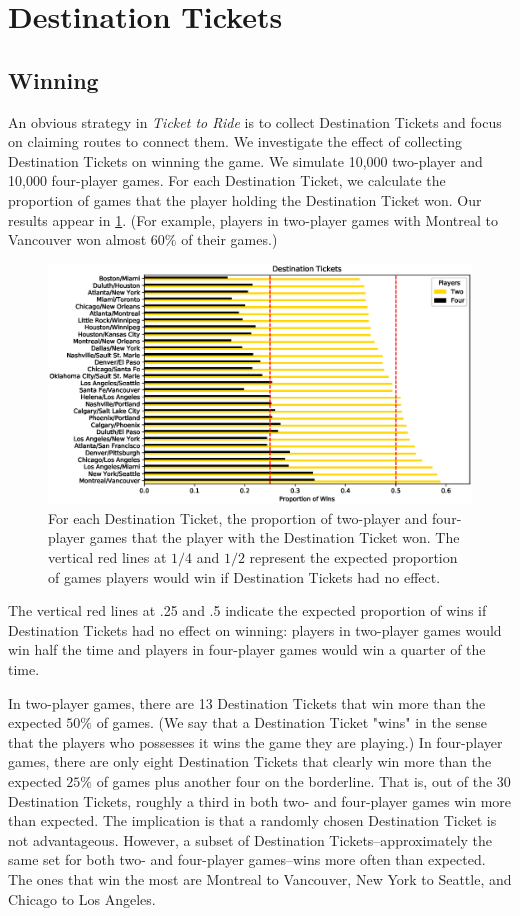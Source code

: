 \newpage
\section{Destination Tickets}

\subsection{Winning}
An obvious strategy in \textit{Ticket to Ride} is to collect
Destination Tickets and focus on claiming routes to connect them.
We investigate the effect of collecting Destination Tickets
on winning the game.
We simulate 10,000 two-player and 10,000 four-player games.
For each Destination Ticket, we calculate the proportion of 
games that the player holding the Destination Ticket won.
Our results appear in \cref{fig:tickets}.
(For example, players in two-player games with Montreal 
to Vancouver won almost $60\%$ of their games.)

\begin{figure}[h]
\centering
\includegraphics[scale=.6]{figures/destination_tickets}
\caption{For each Destination Ticket,
the proportion of two-player and four-player games that 
the player with the Destination Ticket won.
The vertical red lines at $1/4$ and $1/2$ represent
the expected proportion of games players would win
if Destination Tickets had no effect.}
\label{fig:tickets}
\end{figure}

The vertical red lines at .25 and .5 indicate
the expected proportion of wins if Destination Tickets
had no effect on winning: players in two-player games
would win half the time and players in four-player games
would win a quarter of the time.

In two-player games, there are 13 Destination Tickets 
that win more than the expected $50\%$ of games.
(We say that a Destination Ticket "wins" in the sense
that the players who possesses it wins the game they
are playing.)
In four-player games, there are only eight Destination Tickets
that clearly win more than the expected $25\%$ of games plus
another four on the borderline.
That is, out of the 30 Destination Tickets, roughly a third
in both two- and four-player games win more than expected.
The implication is that a randomly chosen Destination 
Ticket is not advantageous.
However, a subset of Destination Tickets--approximately the same
set for both two- and four-player games--wins more often than expected.
The ones that win the most are Montreal to Vancouver,
New York to Seattle, and Chicago to Los Angeles.

